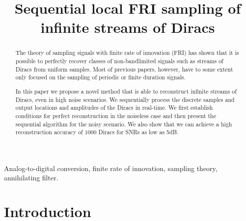\documentclass{article}
\begin{document}
\title{Sequential local FRI sampling of infinite streams of Diracs}

\address{Department of Electrical and Electronic Engineering,
Imperial College London, UK\\
\normalsize \texttt{\{ jon.onativia, jose.uriguen08, p.dragotti \} @imperial.ac.uk}
}

\maketitle


\begin{abstract}
The theory of sampling signals with finite rate of innovation (FRI) has shown 
that it is possible to perfectly recover classes of non-bandlimited signals
such as streams of Diracs from uniform samples. Most of previous papers, 
however, have to some extent only focused on the sampling of periodic or 
finite duration signals. 

In this paper we propose a novel method that is able to reconstruct infinite 
streams of Diracs, even in high noise scenarios.
We sequentially process the discrete samples and output locations and amplitudes
of the Diracs in real-time.
We first establish conditions for perfect reconstruction in the noiseless case
and then present the sequential algorithm for the noisy scenario.
We also show that we can achieve a high reconstruction accuracy of $1000$ Diracs 
for SNRs as low as 5dB.
\end{abstract}

\begin{keywords}
Analog-to-digital conversion, finite rate of innovation, sampling theory,
annihilating filter.
\end{keywords}


\section{Introduction}
\label{sec:intro}
\end{document}
